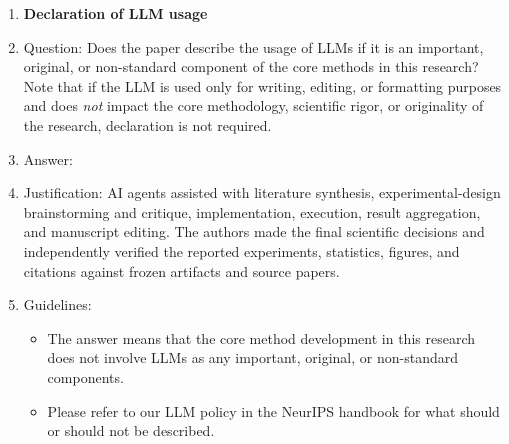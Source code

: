 \documentclass[
]{article}
\begin{document}
\begin{enumerate}
\item {\bf Declaration of LLM usage}
    \item[] Question: Does the paper describe the usage of LLMs if it is an important, original, or non-standard component of the core methods in this research? Note that if the LLM is used only for writing, editing, or formatting purposes and does \emph{not} impact the core methodology, scientific rigor, or originality of the research, declaration is not required.
    \item[] Answer: \answerYes{} %
    \item[] Justification: AI agents assisted with literature synthesis, experimental-design brainstorming and critique, implementation, execution, result aggregation, and manuscript editing. The authors made the final scientific decisions and independently verified the reported experiments, statistics, figures, and citations against frozen artifacts and source papers.
    \item[] Guidelines:
    \begin{itemize}
        \item The answer \answerNA{} means that the core method development in this research does not involve LLMs as any important, original, or non-standard components.
        \item Please refer to our LLM policy in the NeurIPS handbook for what should or should not be described.
    \end{itemize}

\end{enumerate}
\end{document}
